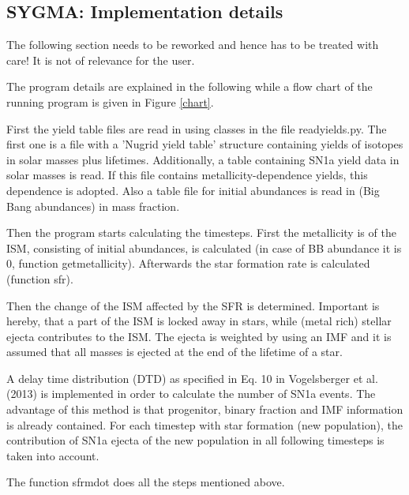 


\subsection{SYGMA: Implementation details}

The following section needs to be reworked and hence
has to be treated with care!
It is not of relevance for the user.

The program details are explained in the following while
a flow chart of the running program is given in Figure \ref{chart}.


First the yield table files are read in using
classes in the file read\textunderscore yields.py.
The first one is a file with a 'Nugrid yield table' structure containing
yields of isotopes in solar masses plus lifetimes. Additionally,
a table containing SN1a yield data in solar masses is read.
If this file contains metallicity-dependence yields, this dependence
is adopted. Also a table file for initial abundances is read in
(Big Bang abundances) in mass fraction.

Then the program starts calculating the timesteps.
First the metallicity is of the ISM, consisting of initial abundances,
is calculated (in case of BB abundance it is 0, function getmetallicity).
Afterwards the star formation rate is calculated (function sfr).

Then the change of the ISM affected by the SFR is determined.
Important is hereby, that a part of the ISM is locked away in stars,
while (metal rich) stellar ejecta contributes to the ISM.
The ejecta is weighted by using an IMF and it is assumed
that all masses is ejected at the end of the lifetime of a star.


A delay time distribution (DTD) as specified
in Eq. 10 in Vogelsberger et al. (2013) is implemented in order
to calculate the number of SN1a events. The advantage of this
method is that progenitor, binary fraction and IMF information
is already contained. For each timestep with star formation
(new population), the contribution of SN1a ejecta of the
new population in all following timesteps is taken into account.


The function sfrmdot does all the steps mentioned above.



